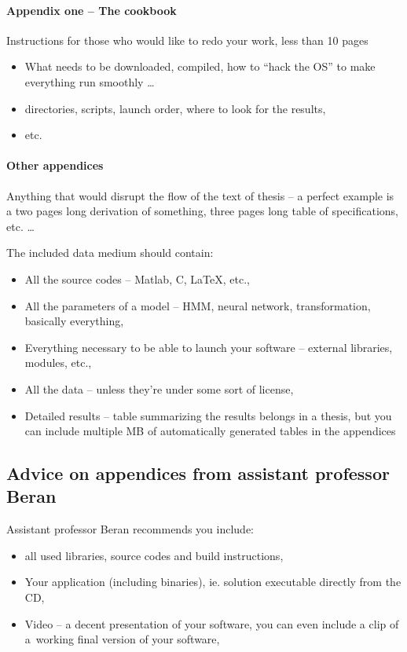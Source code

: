 \paragraph{Appendix one -- The cookbook}

Instructions for those who would like to redo your work, less than 10 pages
\begin{itemize}
  \item{What needs to be downloaded, compiled, how to ``hack the OS'' to make everything run smoothly \ldots}
  \item{directories, scripts, launch order, where to look for the results,}
  \item{etc.}
\end{itemize}

\paragraph{Other appendices}

Anything that would disrupt the flow of the text of thesis -- a perfect example is a two pages long derivation of something, three pages long table of specifications, etc. \ldots

The included data medium should contain:
\begin{itemize}
  \item{All the source codes -- Matlab, C, LaTeX, etc.,}
  \item{All the parameters of a model -- HMM, neural network, transformation, basically everything,}
  \item{Everything necessary to be able to launch your software -- external libraries, modules, etc.,}
  \item{All the data -- unless they're under some sort of license,}
  \item{Detailed results -- table summarizing the results belongs in a thesis, but you can include multiple MB of automatically generated tables in the appendices}
\end{itemize}

\subsection*{Advice on appendices from assistant professor Beran}

Assistant professor Beran recommends you include:
\begin{itemize}
  \item{all used libraries, source codes and build instructions,}
  \item{Your application (including binaries), ie. solution executable directly from the CD,}
  \item{Video -- a decent presentation of your software, you can even include a clip of a~working final version of your software,}
\end{itemize}

